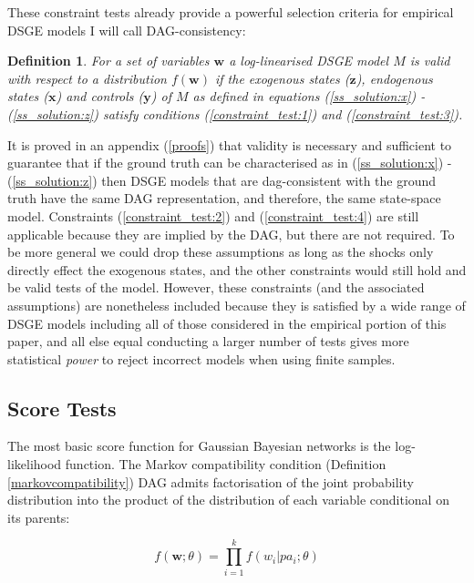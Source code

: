 \documentclass{article}
\newtheorem{definition}{Definition}
\begin{document}
These constraint tests already provide a powerful selection criteria for empirical DSGE models I will call DAG-consistency:

\begin{definition}
  For a set of variables $\mathbf{w}$ a log-linearised DSGE model $M$ is \textit{valid} with respect to a distribution $f(\mathbf{w})$ if the exogenous states ($\mathbf{z}$), endogenous states ($\mathbf{x}$) and controls ($\mathbf{y}$) of $M$ as defined in equations (\ref{ss_solution:x}) - (\ref{ss_solution:z}) satisfy conditions (\ref{constraint_test:1}) and (\ref{constraint_test:3}).
  \label{validity}
\end{definition}

It is proved in an appendix (\ref{proofs}) that validity is necessary and sufficient to guarantee that if the ground truth can be characterised as in (\ref{ss_solution:x}) - (\ref{ss_solution:z}) then DSGE models that are dag-consistent with the ground truth have the same DAG representation, and therefore, the same state-space model. Constraints (\ref{constraint_test:2}) and (\ref{constraint_test:4}) are still applicable because they are implied by the DAG, but there are not required. To be more general we could drop these assumptions as long as the shocks only directly effect the exogenous states, and the other constraints would still hold and be valid tests of the model. However, these constraints (and the associated assumptions) are nonetheless included because they is satisfied by a wide range of DSGE models including all of those considered in the empirical portion of this paper, and all else equal conducting a larger number of tests gives more statistical \textit{power} to reject incorrect models when using finite samples.

\subsection{Score Tests} \label{scoretests}

The most basic score function for Gaussian Bayesian networks is the log-likelihood function. The Markov compatibility condition (Definition \ref{markovcompatibility}) DAG admits factorisation of the joint probability distribution into the product of the distribution of each variable conditional on its parents:

\begin{equation}
  f(\mathbf{w};\theta) = \prod_{i=1}^{k} f(w_i | pa_i;\theta)
\end{equation}
\end{document}
